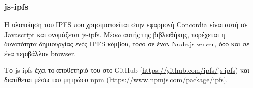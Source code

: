 \subsubsection{js-ipfs} \label{subsection:4-2-4-1-js-ipfs}


H υλοποίηση του IPFS που χρησιμοποείται στην εφαρμογή Concordia είναι αυτή σε Javascript και ονομάζεται js-ipfs. Μέσω αυτής της βιβλιοθήκης, παρέχεται η δυνατότητα δημιουργίας ενός IPFS κόμβου, τόσο σε έναν Node.js server, όσο και σε ένα περιβάλλον browser.

Το js-ipfs έχει το αποθετήριό του στο GitHub (\url{https://github.com/ipfs/js-ipfs}) και διατίθεται μέσω του μητρώου npm (\url{https://www.npmjs.com/package/ipfs}).
